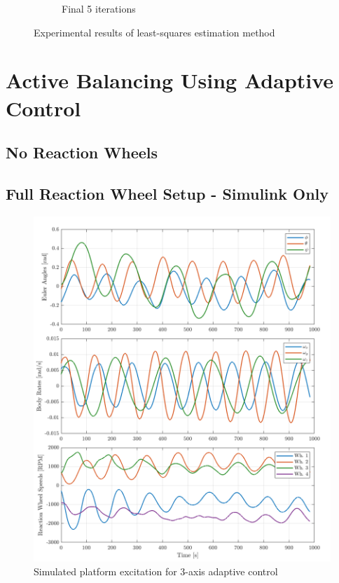 \begin{figure}[ht]
\begin{subfigure}[t]{0.47\textwidth}
    \caption{Final 5 iterations}\label{fig:LSR_hardware_runs_b}
  \end{subfigure}
  \caption{Experimental results of least-squares estimation method}
  \label{fig:LSR_hardware_runs}
\end{figure}



\section{Active Balancing Using Adaptive Control}

\subsection{No Reaction Wheels}

\subsection{Full Reaction Wheel Setup - Simulink Only}

\begin{figure}[ht]
    \centering
    \includegraphics[width=\linewidth]{plots/three_axis_sim_excitation.png}
    \caption{Simulated platform excitation for 3-axis adaptive control}
\end{figure}


